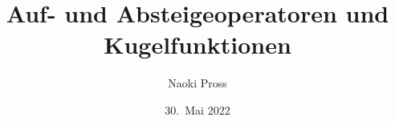 %
%
%


\beamertemplatenavigationsymbolsempty
\title[Kugel]{Auf- und Absteigeoperatoren und Kugelfunktionen}
\author[Naoki Pross]{Naoki Pross}
\date[]{30.~Mai 2022}

